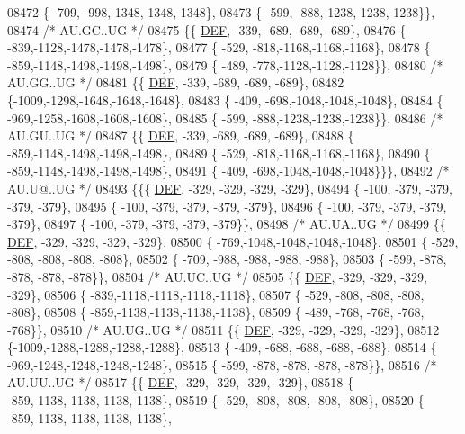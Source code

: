 \begin{DoxyCode}
08472 \{ -709, -998,-1348,-1348,-1348\},
08473 \{ -599, -888,-1238,-1238,-1238\}\},
08474 \textcolor{comment}{/* AU.GC..UG */}
08475 \{\{  \mbox{\hyperlink{1_88_84__epars_8h_a397419fc12b37ed479c8abb9d444d843}{DEF}}, -339, -689, -689, -689\},
08476 \{ -839,-1128,-1478,-1478,-1478\},
08477 \{ -529, -818,-1168,-1168,-1168\},
08478 \{ -859,-1148,-1498,-1498,-1498\},
08479 \{ -489, -778,-1128,-1128,-1128\}\},
08480 \textcolor{comment}{/* AU.GG..UG */}
08481 \{\{  \mbox{\hyperlink{1_88_84__epars_8h_a397419fc12b37ed479c8abb9d444d843}{DEF}}, -339, -689, -689, -689\},
08482 \{-1009,-1298,-1648,-1648,-1648\},
08483 \{ -409, -698,-1048,-1048,-1048\},
08484 \{ -969,-1258,-1608,-1608,-1608\},
08485 \{ -599, -888,-1238,-1238,-1238\}\},
08486 \textcolor{comment}{/* AU.GU..UG */}
08487 \{\{  \mbox{\hyperlink{1_88_84__epars_8h_a397419fc12b37ed479c8abb9d444d843}{DEF}}, -339, -689, -689, -689\},
08488 \{ -859,-1148,-1498,-1498,-1498\},
08489 \{ -529, -818,-1168,-1168,-1168\},
08490 \{ -859,-1148,-1498,-1498,-1498\},
08491 \{ -409, -698,-1048,-1048,-1048\}\}\},
08492 \textcolor{comment}{/* AU.U@..UG */}
08493 \{\{\{  \mbox{\hyperlink{1_88_84__epars_8h_a397419fc12b37ed479c8abb9d444d843}{DEF}}, -329, -329, -329, -329\},
08494 \{ -100, -379, -379, -379, -379\},
08495 \{ -100, -379, -379, -379, -379\},
08496 \{ -100, -379, -379, -379, -379\},
08497 \{ -100, -379, -379, -379, -379\}\},
08498 \textcolor{comment}{/* AU.UA..UG */}
08499 \{\{  \mbox{\hyperlink{1_88_84__epars_8h_a397419fc12b37ed479c8abb9d444d843}{DEF}}, -329, -329, -329, -329\},
08500 \{ -769,-1048,-1048,-1048,-1048\},
08501 \{ -529, -808, -808, -808, -808\},
08502 \{ -709, -988, -988, -988, -988\},
08503 \{ -599, -878, -878, -878, -878\}\},
08504 \textcolor{comment}{/* AU.UC..UG */}
08505 \{\{  \mbox{\hyperlink{1_88_84__epars_8h_a397419fc12b37ed479c8abb9d444d843}{DEF}}, -329, -329, -329, -329\},
08506 \{ -839,-1118,-1118,-1118,-1118\},
08507 \{ -529, -808, -808, -808, -808\},
08508 \{ -859,-1138,-1138,-1138,-1138\},
08509 \{ -489, -768, -768, -768, -768\}\},
08510 \textcolor{comment}{/* AU.UG..UG */}
08511 \{\{  \mbox{\hyperlink{1_88_84__epars_8h_a397419fc12b37ed479c8abb9d444d843}{DEF}}, -329, -329, -329, -329\},
08512 \{-1009,-1288,-1288,-1288,-1288\},
08513 \{ -409, -688, -688, -688, -688\},
08514 \{ -969,-1248,-1248,-1248,-1248\},
08515 \{ -599, -878, -878, -878, -878\}\},
08516 \textcolor{comment}{/* AU.UU..UG */}
08517 \{\{  \mbox{\hyperlink{1_88_84__epars_8h_a397419fc12b37ed479c8abb9d444d843}{DEF}}, -329, -329, -329, -329\},
08518 \{ -859,-1138,-1138,-1138,-1138\},
08519 \{ -529, -808, -808, -808, -808\},
08520 \{ -859,-1138,-1138,-1138,-1138\},

\end{DoxyCode}
